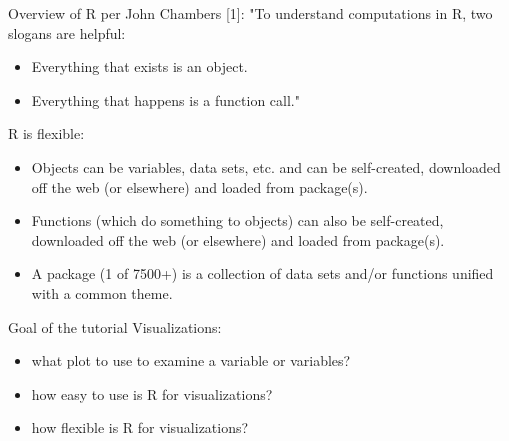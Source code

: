 \begin{frame}
	\begin{center}
  		\begin{block}{Overview of R per John Chambers [1]:} 
			"To understand computations in R, two slogans are helpful:
			\begin{itemize}
			        \item Everything that exists is an object.
			        \item Everything that happens is a function call."
			\end{itemize}
		\end{block}
	\end{center} 

R is flexible: 
	\begin{itemize}
		\item Objects can be variables, data sets, etc. and can be self-created, downloaded off the web (or elsewhere) and loaded from package(s).
		\item Functions (which do something to objects) can also be self-created, downloaded off the web (or elsewhere) and loaded from package(s).
		\item A package (1 of 7500+) is a collection of data sets and/or functions unified with a common theme.
	\end{itemize}
\end{frame}

\begin{frame}
	\begin{center}
  		\begin{block}{Goal of the tutorial} 
Visualizations:
	\begin{itemize}
		\item what plot to use to examine a variable or variables?
		\item how easy to use is R for visualizations?
		\item how flexible is R for visualizations?
	\end{itemize}		
		\end{block}
	\end{center} 
\end{frame}








